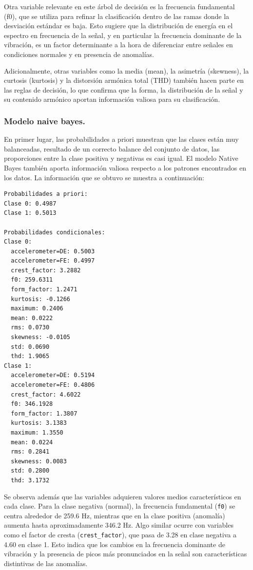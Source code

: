 \documentclass[11pt,a4paper,spanish]{book}
\numberwithin{equation}{chapter}
\numberwithin{figure}{chapter}
\begin{document}
Otra variable relevante en este árbol de decisión es la frecuencia fundamental (f0), 
que se utiliza para refinar la clasificación dentro de las ramas donde la desviación 
estándar es baja. Esto sugiere que la distribución de energía en el espectro en 
frecuencia de la señal, y en particular la frecuencia dominante de la vibración, es un 
factor determinante a la hora de diferenciar entre señales en condiciones normales y en 
presencia de anomalías. 


Adicionalmente, otras variables como la media (mean), la asimetría (skewness), la 
curtosis (kurtosis) y la distorsión armónica total (THD) también hacen parte en las 
reglas de decisión, lo que confirma que la forma, la distribución de la señal y su 
contenido armónico aportan información valiosa para su clasificación.



\subsubsection{Modelo naive bayes.}

En primer lugar, las probabilidades a priori muestran que las clases están muy 
balanceadas, resultado de un correcto balance del conjunto de datos, las proporciones 
entre la clase positiva y negativas es casi igual. 
El modelo Native Bayes también aporta información valiosa respecto a los patrones 
encontrados en los datos. La información que se obtuvo se muestra a continuación:  


\vspace{5mm}
\begin{lstlisting}[language={}, basicstyle=\ttfamily\footnotesize\color{black}, frame=lines]
Probabilidades a priori:
Clase 0: 0.4987
Clase 1: 0.5013

Probabilidades condicionales:
Clase 0:
  accelerometer=DE: 0.5003
  accelerometer=FE: 0.4997
  crest_factor: 3.2882
  f0: 259.6311
  form_factor: 1.2471
  kurtosis: -0.1266
  maximum: 0.2406
  mean: 0.0222
  rms: 0.0730
  skewness: -0.0105
  std: 0.0690
  thd: 1.9065
Clase 1:
  accelerometer=DE: 0.5194
  accelerometer=FE: 0.4806
  crest_factor: 4.6022
  f0: 346.1928
  form_factor: 1.3807
  kurtosis: 3.1383
  maximum: 1.3550
  mean: 0.0224
  rms: 0.2841
  skewness: 0.0083
  std: 0.2800
  thd: 3.1732
\end{lstlisting}



Se observa además que las variables adquieren valores medios característicos en cada 
clase. Para la clase negativa (normal), la frecuencia fundamental (\lstinline|f0|) se 
centra alrededor de 259.6 Hz, mientras que en la clase positiva (anomalía) aumenta hasta 
aproximadamente 346.2 Hz. 
Algo similar ocurre con variables como el factor de cresta (\lstinline|crest_factor|), 
que pasa de 3.28 en clase negativa a 4.60 en clase 1. Esto indica que los cambios en la 
frecuencia dominante de vibración y la  presencia de picos más pronunciados en la señal 
son características distintivas de las anomalías.
\end{document}
